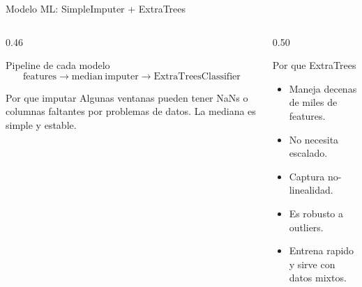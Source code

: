 \documentclass[10pt,aspectratio=169]{beamer}
\begin{document}
\begin{frame}{Modelo ML: SimpleImputer + ExtraTrees}
\small
\begin{columns}[T,totalwidth=\textwidth]
\begin{column}{0.46\textwidth}
\begin{block}{Pipeline de cada modelo}
\[
\mathrm{features}
\rightarrow
\mathrm{median\ imputer}
\rightarrow
\mathrm{ExtraTreesClassifier}
\]
\end{block}
\begin{block}{Por que imputar}
Algunas ventanas pueden tener NaNs o columnas faltantes por problemas de datos. La mediana es simple y estable.
\end{block}
\end{column}
\begin{column}{0.50\textwidth}
\begin{exampleblock}{Por que ExtraTrees}
\begin{itemize}
  \item Maneja decenas de miles de features.
  \item No necesita escalado.
  \item Captura no-linealidad.
  \item Es robusto a outliers.
  \item Entrena rapido y sirve con datos mixtos.
\end{itemize}
\end{exampleblock}
\end{column}
\end{columns}
\end{frame}
\end{document}
